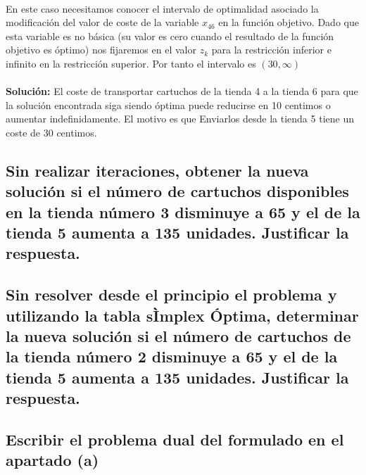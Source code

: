 \documentclass[10pt, a4paper]{article}
\begin{document}
			\paragraph{}
			En este caso necesitamos conocer el intervalo de optimalidad asociado la modificación del valor de coste de la variable \(x_{46}\) en la función objetivo. Dado que esta variable es no básica (su valor es cero cuando el resultado de la función objetivo es óptimo) nos fijaremos en el valor \(z_{k}\) para la restricción inferior e infinito en la restricción superior. Por tanto el intervalo es \((30,\infty)\)

			\paragraph{}
			\textbf{Solución:} El coste de transportar cartuchos de la tienda 4 a la tienda 6 para que la solución encontrada siga siendo óptima puede reducirse en 10 centimos o aumentar indefinidamente. El motivo es que Enviarlos desde la tienda 5 tiene un coste de 30 centimos.


		\subsection{Sin realizar iteraciones, obtener la nueva solución si el número de cartuchos disponibles en la tienda número 3 disminuye a 65 y el de la tienda 5 aumenta a 135 unidades. Justificar la respuesta.}

			\paragraph{}


		\subsection{Sin resolver desde el principio el problema y utilizando la tabla sÌmplex Óptima, determinar la nueva solución si el número de cartuchos de la tienda número 2 disminuye a 65 y el de la tienda 5 aumenta a 135 unidades. Justificar la respuesta.}

			\paragraph{}


		\subsection{Escribir el problema dual del formulado en el apartado (a)}
\end{document}
